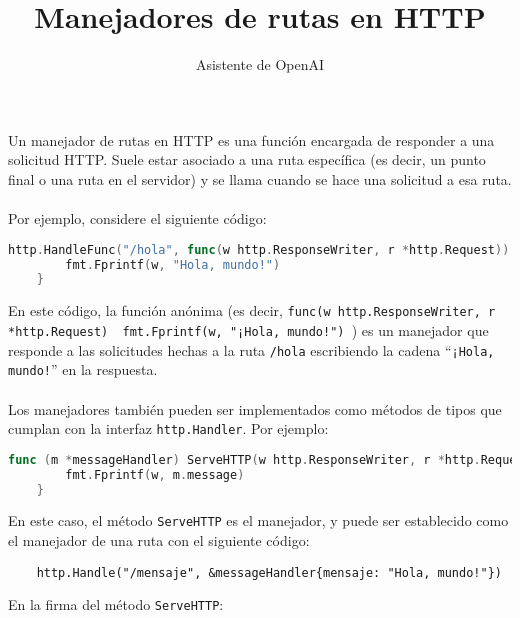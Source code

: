 \documentclass[]{article}
\title{Manejadores de rutas en HTTP}
\author{Asistente de OpenAI}
\date{}
\newcommand{\quotes}[1]{``#1''}
\begin{document}
\maketitle

Un manejador de rutas en HTTP es una función encargada de responder a una solicitud HTTP. Suele estar asociado a una ruta específica (es decir, un punto final o una ruta en el servidor) y se llama cuando se hace una solicitud a esa ruta.
\\\\
Por ejemplo, considere el siguiente código:

\begin{lstlisting}[language=Go]
	http.HandleFunc("/hola", func(w http.ResponseWriter, r *http.Request)) {
		fmt.Fprintf(w, "Hola, mundo!")
	}
\end{lstlisting}

En este código, la función anónima (es decir, \texttt{func(w http.ResponseWriter, r *http.Request) { fmt.Fprintf(w, "¡Hola, mundo!") }}) es un manejador que responde a las solicitudes hechas a la ruta \texttt{/hola} escribiendo la cadena \quotes{\texttt{¡Hola, mundo!}} en la respuesta.
\\\\
Los manejadores también pueden ser implementados como métodos de tipos que cumplan con la interfaz \texttt{http.Handler}. Por ejemplo:

\begin{lstlisting}[language=Go]
	func (m *messageHandler) ServeHTTP(w http.ResponseWriter, r *http.Request) {
		fmt.Fprintf(w, m.message)
	}
\end{lstlisting}

En este caso, el método \texttt{ServeHTTP} es el manejador, y puede ser establecido como el manejador de una ruta con el siguiente código:

\begin{lstlisting}
	http.Handle("/mensaje", &messageHandler{mensaje: "Hola, mundo!"})
\end{lstlisting}

En la firma del método \texttt{ServeHTTP}:

\begin{abstract}

\end{abstract}

\section{}
\end{document}
